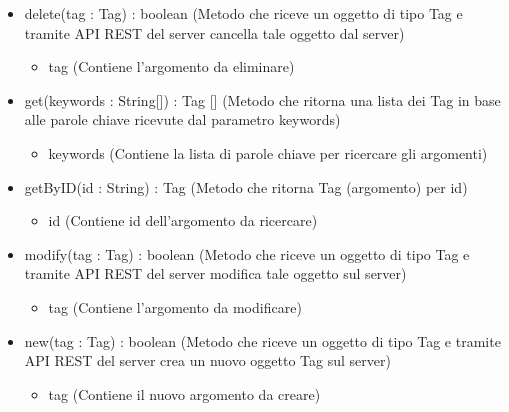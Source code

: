 \begin{description}
\begin{itemize}
\item delete(tag : Tag) : boolean (Metodo che riceve un oggetto di tipo Tag e tramite API REST del server cancella tale oggetto dal server)\begin{itemize}
\item tag (Contiene l'argomento da eliminare)
\end{itemize}

\item get(keywords : String[]) : Tag [] (Metodo che ritorna una lista dei Tag in base alle parole chiave ricevute dal parametro keywords)\begin{itemize}
\item keywords (Contiene la lista di parole chiave per ricercare gli argomenti)
\end{itemize}

\item getByID(id : String) : Tag (Metodo che ritorna Tag (argomento) per id)\begin{itemize}
\item id (Contiene id dell'argomento da ricercare)
\end{itemize}

\item modify(tag : Tag) : boolean (Metodo che riceve un oggetto di tipo Tag e tramite API REST del server modifica tale oggetto sul server)\begin{itemize}
\item tag (Contiene l'argomento da modificare)
\end{itemize}

\item new(tag : Tag) : boolean (Metodo che riceve un oggetto di tipo Tag e tramite API REST del server crea un nuovo oggetto Tag sul server)\begin{itemize}
\item tag (Contiene il nuovo argomento da creare)
\end{itemize}

\end{itemize}

\end{description}

